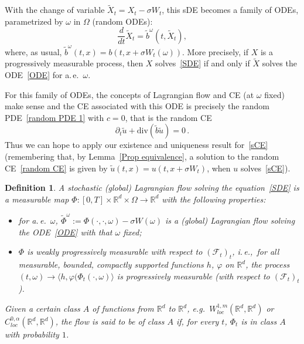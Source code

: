 \documentclass[a4paper,10pt]{article}
\newtheorem{definition}[theorem]{Definition}
\newcommand{\mr}{\mathbb{R}}
\newcommand{\mc}{\mathcal}
\newcommand{\lan}{\langle}
\newcommand{\ran}{\rangle}
\newcommand{\diverg}{\mathrm{div}}
\newcommand{\td}{\tilde}
\begin{document}
With the change of variable $\td{X}_t=X_t-\sigma W_t$, this sDE becomes a family of ODEs, parametrized by $\omega$ in $\Omega$ (random ODEs):
\begin{equation}
\frac{d}{dt}\td{X}_t=\td{b}^{\omega}(t,\td{X}_t),\label{ODE}
\end{equation}
where, as usual, $\td{b}^\omega(t,x)=b(t,x+\sigma W_t(\omega))$. More precisely, if $X$ is a progressively measurable process, then $X$ solves~\eqref{SDE} if and only if $\td{X}$ solves the ODE~\eqref{ODE} for a.\,e.\ $\omega$.

For this family of ODEs, the concepts of Lagrangian flow and CE (at $\omega$ fixed) make sense and the CE associated with this ODE is precisely the random PDE~\eqref{random PDE 1} with $c=0$, that is the random CE
\begin{equation}
\partial_t\td{u}+\diverg(\td{b}\td{u})=0 \, .\label{random CE}
\end{equation}
Thus we can hope to apply our existence and uniqueness result for~\eqref{sCE} (remembering that, by Lemma~\ref{Prop equivalence}, a solution to the random CE~\eqref{random CE} is given by $\td{u}(t,x)=u(t,x+\sigma W_t)$, when $u$ solves~\eqref{sCE}).

\begin{definition}
A stochastic (global) Lagrangian flow solving the equation~\eqref{SDE} is a measurable map $\Phi \colon [0,T]\times\mr^d\times\Omega\rightarrow\mr^d$ with the following properties:
\begin{itemize}
\item for a.\,e.\ $\omega$, $\td{\Phi}^\omega:=\Phi(\cdot,\cdot,\omega)-\sigma W(\omega)$ is a (global) Lagrangian flow solving the ODE~\eqref{ODE} with that $\omega$ fixed;
\item $\Phi$ is weakly progressively measurable with respect to $(\mc{F}_t)_t$, i.\,e.,\ for all measurable, bounded, compactly supported functions $h$, $\varphi$ on $\mr^d$, the process $(t,\omega)\rightarrow\lan h,\varphi(\Phi_t(\cdot,\omega)\ran$ is progressively measurable (with respect to $(\mc{F}_t)_t$).
\end{itemize}
Given a certain class $A$ of functions from $\mr^d$ to $\mr^d$, e.g.\ $W^{1,m}_{loc}(\mr^d,\mr^d)$ or $C^{0,\alpha}_{loc}(\mr^d,\mr^d)$, the flow is said to be of class $A$ if, for every $t$, $\Phi_t$ is in class $A$ with probability $1$.
\end{definition}
\end{document}

